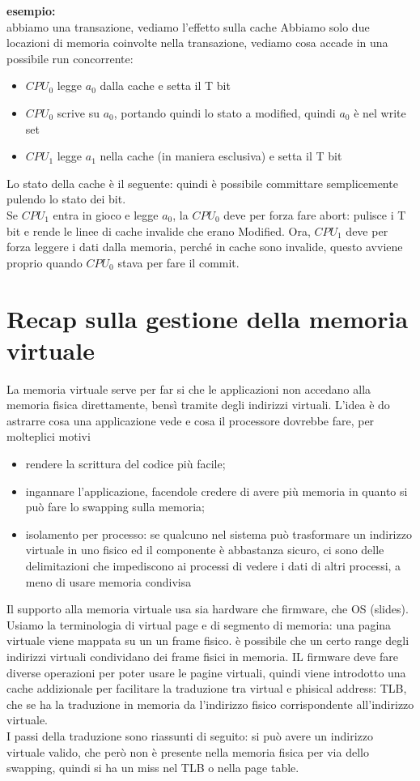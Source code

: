 \documentclass[12pt, oneside]{extbook} %
\begin{document}
\textbf{esempio:}\\ abbiamo una transazione, vediamo l'effetto sulla cache
Abbiamo solo due locazioni di memoria coinvolte nella transazione, vediamo cosa accade in una possibile run concorrente:
\begin{itemize}
\item $CPU_0$ legge $a_0$ dalla cache e setta il T bit
\item $CPU_0$ scrive su $a_0$, portando quindi lo stato a modified, quindi $a_0$ è nel write set
\item $CPU_1$ legge $a_1$ nella cache (in maniera esclusiva) e setta il T bit
\end{itemize}
Lo stato della cache è il seguente:
quindi è possibile committare semplicemente pulendo lo stato dei bit.\\ Se $CPU_1$ entra in gioco e legge $a_0$, la $CPU_0$ deve per forza fare abort: pulisce i T bit e rende le linee di cache invalide che erano Modified. Ora, $CPU_1$ deve per forza leggere i dati dalla memoria, perché in cache sono invalide, questo avviene proprio quando $CPU_0$ stava per fare il commit.
\section{Recap sulla gestione della memoria virtuale}
La memoria virtuale serve per far si che le applicazioni non accedano alla memoria fisica direttamente, bensì tramite degli indirizzi virtuali. L'idea è do astrarre cosa una applicazione vede e cosa il processore dovrebbe fare, per molteplici motivi
\begin{itemize}
\item rendere la scrittura del codice più facile;
\item ingannare l'applicazione, facendole credere di avere più memoria in quanto si può fare lo swapping sulla memoria;
\item isolamento per processo: se qualcuno nel sistema può trasformare un indirizzo virtuale in uno fisico ed il componente è abbastanza sicuro, ci sono delle delimitazioni che impediscono ai processi di vedere i dati di altri processi, a meno di usare memoria condivisa
\end{itemize}
Il supporto alla memoria virtuale usa sia hardware che firmware, che OS (slides).\\ Usiamo la terminologia di virtual page e di segmento di memoria: una pagina virtuale viene mappata su un un frame fisico.
è possibile che un certo range degli indirizzi virtuali condividano dei frame fisici in memoria. IL firmware deve fare diverse operazioni per poter usare le pagine virtuali, quindi viene introdotto una cache addizionale per facilitare la traduzione tra virtual e phisical address: TLB, che se ha la traduzione in memoria da l'indirizzo fisico corrispondente all'indirizzo virtuale.\\ I passi della traduzione sono riassunti di seguito:
si può avere un indirizzo virtuale valido, che però non è presente nella memoria fisica per via dello swapping, quindi si ha un miss nel TLB o nella page table.
\end{document}
